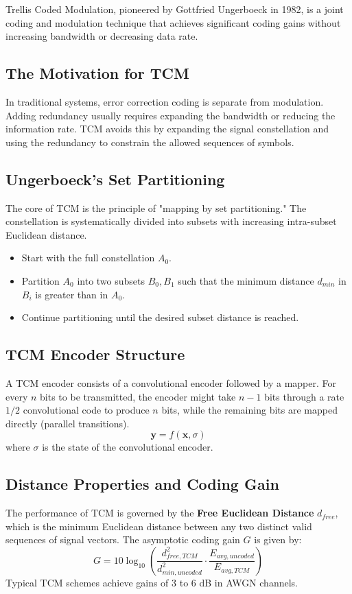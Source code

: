 
Trellis Coded Modulation, pioneered by Gottfried Ungerboeck in 1982, is a joint coding and modulation technique that achieves significant coding gains without increasing bandwidth or decreasing data rate.

\subsection{The Motivation for TCM}
In traditional systems, error correction coding is separate from modulation. Adding redundancy usually requires expanding the bandwidth or reducing the information rate. TCM avoids this by expanding the signal constellation and using the redundancy to constrain the allowed sequences of symbols.

\subsection{Ungerboeck's Set Partitioning}
The core of TCM is the principle of "mapping by set partitioning." The constellation is systematically divided into subsets with increasing intra-subset Euclidean distance.
\begin{itemize}
    \item Start with the full constellation $A_0$.
    \item Partition $A_0$ into two subsets $B_0, B_1$ such that the minimum distance $d_{min}$ in $B_i$ is greater than in $A_0$.
    \item Continue partitioning until the desired subset distance is reached.
\end{itemize}

\subsection{TCM Encoder Structure}
A TCM encoder consists of a convolutional encoder followed by a mapper. For every $n$ bits to be transmitted, the encoder might take $n-1$ bits through a rate $1/2$ convolutional code to produce $n$ bits, while the remaining bits are mapped directly (parallel transitions).
\begin{equation}
    \mathbf{y} = f(\mathbf{x}, \sigma)
\end{equation}
where $\sigma$ is the state of the convolutional encoder.

\subsection{Distance Properties and Coding Gain}
The performance of TCM is governed by the \textbf{Free Euclidean Distance} $d_{free}$, which is the minimum Euclidean distance between any two distinct valid sequences of signal vectors.
The asymptotic coding gain $G$ is given by:
\begin{equation}
    G = 10 \log_{10} \left( \frac{d_{free, TCM}^2}{d_{min, uncoded}^2} \cdot \frac{E_{avg, uncoded}}{E_{avg, TCM}} \right)
\end{equation}
Typical TCM schemes achieve gains of 3 to 6 dB in AWGN channels.

